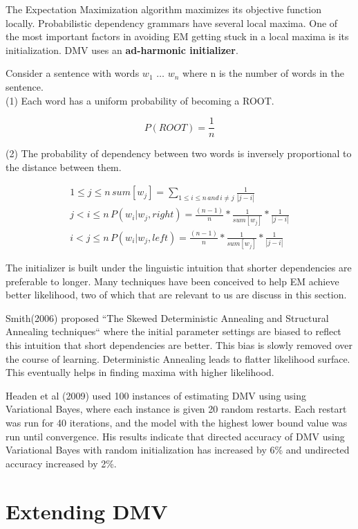 \documentclass{article}
\begin{document}
The Expectation Maximization algorithm maximizes its objective function locally. Probabilistic dependency grammars have several local maxima. One of the most important factors in avoiding EM getting stuck in a local maxima is its initialization. DMV uses an \textbf{ad-harmonic initializer}. 

Consider a sentence with words $w_1$ $\ldots$ $w_n$ where n is the number of words in the sentence.\\

(1) Each word has a uniform probability of becoming a ROOT.

   $$ P(ROOT) =  \frac{1}{n} $$

(2) The probability of dependency between two words is inversely proportional to the distance between them.

\begin{gather*}
    1 \le j \le n \, sum[w_j] = \sum_{1 \le i \le n \, and \, i \ne j} \frac{1}{|{j-i}|} \\
   j < i \le n \, P(w_i| w_j, right)  =  \frac{(n-1)}{n} * \frac{1}{sum[w_j]} * \frac{1}{|{j-i}|} \\
   i < j \le n \, P(w_i| w_j, left)  =  \frac{(n-1)}{n} * \frac{1}{sum[w_j]} * \frac{1}{|{j-i}|}
\end{gather*}

The initializer is built under the linguistic intuition that shorter dependencies are preferable to longer. Many techniques have been conceived to help EM achieve better likelihood, two of which that are relevant to us are discuss in this section.

Smith(2006) \cite{smith2006} proposed ``The Skewed Deterministic Annealing and Structural Annealing techniques`` where the initial parameter settings are biased to reflect this intuition that short dependencies are better. This bias is slowly removed over the course of learning. Deterministic Annealing leads to flatter likelihood surface. This eventually helps in finding maxima with higher likelihood.

  Headen et al (2009) \cite{headden2009} used 100 instances of estimating DMV using using Variational Bayes, where each instance is given 20 random restarts. Each restart was run for 40 iterations, and the model with the highest lower bound value was run until convergence. His results indicate that directed accuracy of DMV using Variational Bayes with random initialization has increased by 6\% and undirected accuracy increased by 2\%.

\section{Extending DMV}
\end{document}

